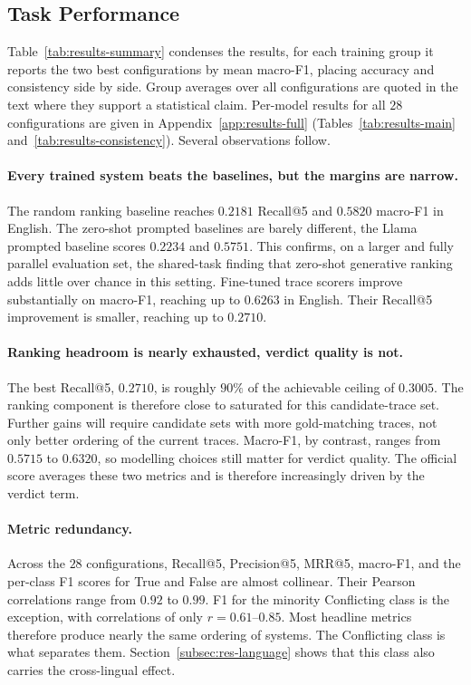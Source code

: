 \subsection{Task Performance}
\label{subsec:res-task}

Table~\ref{tab:results-summary} condenses the results, for each training group it reports the two
best configurations by mean macro-F1, placing accuracy and consistency side by side. Group averages
over all configurations are quoted in the text where they support a statistical claim. Per-model results for all $28$ configurations are given in
Appendix~\ref{app:results-full} (Tables~\ref{tab:results-main} and~\ref{tab:results-consistency}).
Several observations follow.



\paragraph{Every trained system beats the baselines, but the margins are narrow.}
The random ranking baseline reaches $0.2181$ Recall@5 and $0.5820$ macro-F1 in English. The zero-shot
prompted baselines are barely different, the Llama prompted baseline scores $0.2234$ and $0.5751$.
This confirms, on a larger and fully parallel evaluation set, the shared-task finding that zero-shot
generative ranking adds little over chance in this setting. Fine-tuned trace scorers improve
substantially on macro-F1, reaching up to $0.6263$ in English. Their Recall@5 improvement is smaller,
reaching up to $0.2710$.

\paragraph{Ranking headroom is nearly exhausted, verdict quality is not.}
The best Recall@5, $0.2710$, is roughly $90\%$ of the achievable ceiling of $0.3005$. The ranking
component is therefore close to saturated for this candidate-trace set. Further gains will require
candidate sets with more gold-matching traces, not only better ordering of the current traces.
Macro-F1, by contrast, ranges from $0.5715$ to $0.6320$, so modelling choices still matter for
verdict quality. The official score averages these two metrics and is therefore increasingly driven
by the verdict term.

\paragraph{Metric redundancy.}
Across the $28$ configurations, Recall@5, Precision@5, MRR@5, macro-F1, and the per-class F1 scores
for \textsf{True} and \textsf{False} are almost collinear. Their Pearson correlations range from
$0.92$ to $0.99$. F1 for the minority \textsf{Conflicting} class is the exception, with correlations
of only $r=0.61$--$0.85$. Most headline metrics therefore produce nearly the same ordering of
systems. The \textsf{Conflicting} class is what separates them. Section~\ref{subsec:res-language}
shows that this class also carries the cross-lingual effect.

